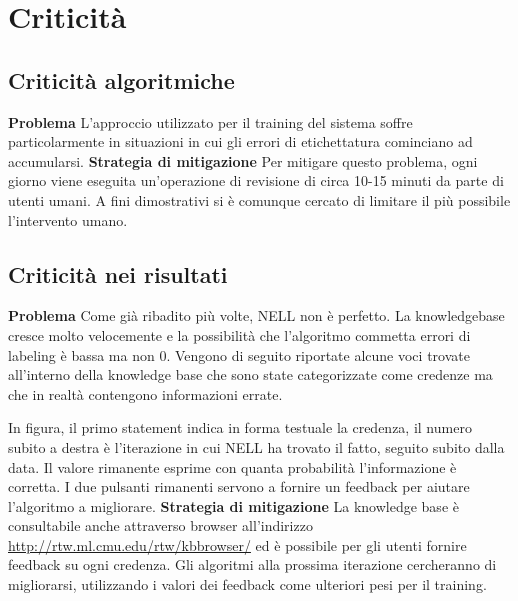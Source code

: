 \section{Criticità}

\subsection{Criticità algoritmiche}
\textbf{Problema}\newline
L'approccio utilizzato per il training del sistema soffre particolarmente in situazioni in cui gli errori di etichettatura cominciano ad accumularsi.\newline\newline
\textbf{Strategia di mitigazione}\newline
Per mitigare questo problema, ogni giorno viene eseguita un'operazione di revisione di circa 10-15 minuti da parte di utenti umani. A fini dimostrativi si è comunque cercato di limitare il più possibile l'intervento umano\cite{TowardAnArchitecture:online}.

\subsection{Criticità nei risultati}
\textbf{Problema}\newline
Come già ribadito più volte, NELL non è perfetto. La knowledgebase cresce molto velocemente e la possibilità che l'algoritmo commetta errori di labeling è bassa ma non 0. Vengono di seguito riportate alcune voci trovate all'interno della knowledge base che sono state categorizzate come credenze ma che in realtà contengono informazioni errate.

\noindent In figura, il primo statement indica in forma testuale la credenza, il numero subito a destra è l'iterazione in cui NELL ha trovato il fatto, seguito subito dalla data. Il valore rimanente esprime con quanta probabilità l'informazione è corretta. I due pulsanti rimanenti servono a fornire un feedback per aiutare l'algoritmo a migliorare.\newline\newline
\textbf{Strategia di mitigazione}\newline
La knowledge base è consultabile anche attraverso browser all'indirizzo \url{http://rtw.ml.cmu.edu/rtw/kbbrowser/} ed è possibile per gli utenti fornire feedback su ogni credenza. Gli algoritmi alla prossima iterazione cercheranno di migliorarsi, utilizzando i valori dei feedback come ulteriori pesi per il training.
\newpage